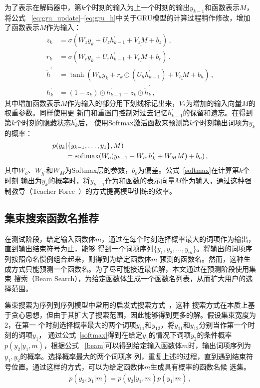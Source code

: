 为了表示在解码器中，第$k$个时刻的输入为上一个时刻的输出$y_{k-1}$和函数表示$M$，将公式
~\eqref{eq:gru_update}--\eqref{eq:gru_h}中关于GRU模型的计算过程稍作修改，增加了函数表示$M$作为输入：
\begin{align}
z_k &= \sigma(W_z y_k + U_z h^\prime_{k-1} + \underline{V_z M} + b_z) \,, \\
r_k &= \sigma(W_r y_k + U_r h^\prime_{k-1} + \underline{V_r M} + b_r) \,.\\
\tilde{h}^\prime &= \tanh(W_h y_k + r_k \odot (U_h h^\prime_{k-1}) + 
\underline{V_h M} + 
b_h) \,, \\
h^\prime_k &= (1-z_k)\odot h^\prime_{k-1} + z_k \odot \tilde h^\prime_k \,, 
\end{align}
其中增加函数表示$M$作为输入的部分用下划线标记出来，$V_{*}$为增加的输入向量$M$的权重参数。同样使用更
新门和重置门控制对过去记忆$h^\prime_{k-1}$的保留和遗忘。在得到第$k$个时刻的隐藏状态$h^\prime_k$后，
使用Softmax激活函数来预测第$k$个时刻输出词项为$y_k$的概率：
\begin{align}
p(y_k&|\{y_{k-1}, \dots, y_1\}, M) \notag\\
&= \text{softmax}(W_o(y_{k-1} + W_{h^\prime}h^\prime_k + W_M M) + b_o) \,,
\label{softmax}
\end{align}
其中$W_o$、$W_{h^\prime}$和$W_M$为Softmax层的参数，$b_o$为偏差。公式~\eqref{softmax}在计算第$k$个时刻
输出为$y_k$的概率时，将$y_{k-1}$作为和函数的表示向量$M$作为输入，通过这种强制教导（Teacher
Force~\cite{Williams1989learning}）的方式提高模型训练的效率。

\subsection{集束搜索函数名推荐}
在测试阶段，给定输入函数体$m$，通过在每个时刻选择概率最大的词项作为输出，直到输出结束符号为止，能够
得到一个词项序列$\{y_1,y_2,\dots,y_m\}$。将输出的词项序列按照命名惯例组合起来，则得到为给定函数体$m$
预测的函数名。然而，这种生成方式只能预测一个函数名。为了尽可能接近最优解，本文通过在预测阶段使用集束
搜索（Beam Search），为给定函数体生成一个函数名列表，从而扩大用户的选择范围。

集束搜索为序列到序列模型中常用的启发式搜索方式~\cite{Graves2012Sequence,sutskever2014sequence}，这种
搜索方式在本质上基于贪心思想，但由于其扩大了搜索范围，因此能够得到更多的解。假设集束宽度为2，在第一
个时刻选择概率最大的两个词项$y_{11}$和$y_{12}$，将$y_{11}$和$y_{12}$分别当作第一个时刻的词项$y_1$，
通过公式~\eqref{softmax}得到在给定$y_1$的情况下词项$y_2$的条件概率$p(y_2|y_1,m)$，根据公式
~\eqref{beam}可以得到给定输入函数体$m$时，输出词项序列为$y_1,y_2$的概率。选择概率最大的两个词项序
列，重复上述的过程，直到遇到结束符号位置。通过这样的方式，可以为给定函数体$m$生成具有概率的函数名候
选集。
\begin{align}
p(y_2,y_1|m) = p(y_2|y_1,m)p(y_1|m) \,,
\label{beam}
\end{align}

